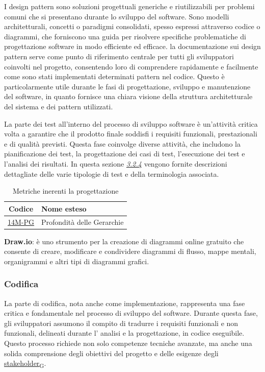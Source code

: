 I design pattern  sono soluzioni progettuali generiche e riutilizzabili per problemi comuni che si presentano durante lo sviluppo del software. Sono modelli architetturali, concetti o paradigmi consolidati, spesso espressi attraverso codice o diagrammi, che forniscono una guida per risolvere specifiche problematiche di progettazione software in modo efficiente ed efficace. la documentazione sui design pattern serve come punto di riferimento centrale per tutti gli sviluppatori coinvolti nel progetto, consentendo loro di comprendere rapidamente e facilmente come sono stati implementati determinati pattern nel codice. Questo è particolarmente utile durante le fasi di progettazione, sviluppo e manutenzione del software, in quanto fornisce una chiara visione della struttura architetturale del sistema e dei pattern utilizzati.

La parte dei test all'interno del processo di sviluppo software è un'attività critica volta a garantire che il prodotto finale soddisfi i requisiti funzionali, prestazionali e di qualità previsti. Questa fase coinvolge diverse attività, che includono la pianificazione dei test, la progettazione dei casi di test, l'esecuzione dei test e l'analisi dei risultati. In questa sezione \hyperref[testing]{\textit{3.2.4}} vengono fornite descrizioni dettagliate delle varie tipologie di test e della terminologia associata.

\begin{table}[!h]
	\centering
	\begin{tabular}{ | c | l | }
		\hline
		\textbf{Codice}                     & \textbf{Nome esteso}       \\
		\hline
		\underline{\hyperlink{14M}{14M-PG}} & Profondità delle Gerarchie \\
		\hline
	\end{tabular}
	\caption{Metriche inerenti la progettazione}
\end{table}

\textbf{Draw.io}: è uno strumento per la creazione di diagrammi online gratuito che consente di creare, modificare e condividere diagrammi di flusso, mappe mentali, organigrammi e altri tipi di diagrammi grafici.

\subsubsection{Codifica}
La parte di codifica, nota anche come implementazione, rappresenta una fase critica e fondamentale nel processo di sviluppo del software. Durante questa fase, gli sviluppatori assumono il compito di tradurre i requisiti funzionali e non funzionali, delineati durante l' analisi e la progettazione, in codice eseguibile. Questo processo richiede non solo competenze tecniche avanzate, ma anche una solida comprensione degli obiettivi del progetto e delle esigenze degli \href{https://7last.github.io/docs/rtb/documentazione-interna/glossario\#stakeholder}{stakeholder\textsubscript{G}}.

